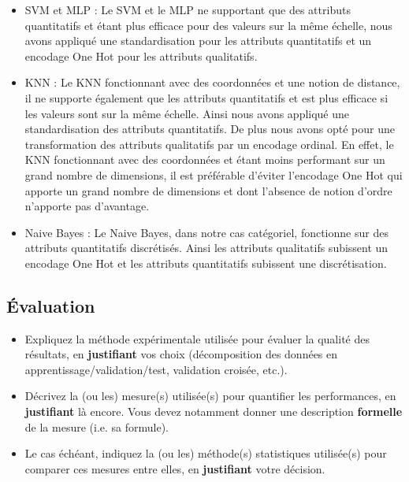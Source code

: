 \documentclass{ceri/sty/rapport}
\begin{document}
\begin{itemize}
    \item SVM et MLP : Le SVM et le MLP ne supportant que des attributs quantitatifs et étant plus efficace pour des valeurs sur la même échelle, nous avons appliqué une standardisation pour les attributs quantitatifs et un encodage One Hot pour les attributs qualitatifs.\\
    
    \item KNN : Le KNN fonctionnant avec des coordonnées et une notion de distance, il ne supporte également que les attributs quantitatifs et est plus efficace si les valeurs sont sur la même échelle. Ainsi nous avons appliqué une standardisation des attributs quantitatifs. De plus nous avons opté pour une transformation des attributs qualitatifs par un encodage ordinal. En effet, le KNN fonctionnant avec des coordonnées et étant moins performant sur un grand nombre de dimensions, il est préférable d'éviter l'encodage One Hot qui apporte un grand nombre de dimensions et dont l'absence de notion d'ordre n'apporte pas d'avantage.\\
    
    \item Naive Bayes : Le Naive Bayes, dans notre cas catégoriel, fonctionne sur des attributs quantitatifs discrétisés. Ainsi les attributs qualitatifs subissent un encodage One Hot et les attributs quantitatifs subissent une discrétisation.
\end{itemize}



\subsection{Évaluation}
\begin{itemize}
	\item Expliquez la méthode expérimentale utilisée pour évaluer la qualité des résultats, en \textbf{justifiant} vos choix (décomposition des données en apprentissage/validation/test, validation croisée, etc.).
	\item Décrivez la (ou les) mesure(s) utilisée(s) pour quantifier les performances, en \textbf{justifiant} là encore. Vous devez notamment donner une description \textbf{formelle} de la mesure (i.e. sa formule).
	\item Le cas échéant, indiquez la (ou les) méthode(s) statistiques utilisée(s) pour comparer ces mesures entre elles, en \textbf{justifiant} votre décision.
\end{itemize}
\end{document}
